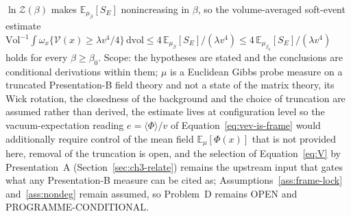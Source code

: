 \(\ln\mathcal Z(\beta)\) makes \(\mathbb E_{\mu_\beta}[S_E]\) nonincreasing in \(\beta\), so the volume-averaged soft-event estimate \(\mathrm{Vol}^{-1}\int\omega_x\{\mathcal V(x)\ge\lambda v^4/4\}\,\mathrm{dvol}\le4\,\mathbb E_{\mu_\beta}[S_E]/(\lambda v^4)\le4\,\mathbb E_{\mu_{\beta_0}}[S_E]/(\lambda v^4)\) holds for every \(\beta\ge\beta_0\). Scope: the hypotheses are stated and the conclusions are conditional derivations within them; \(\mu\) is a Euclidean Gibbs probe measure on a truncated Presentation-B field theory and not a state of the matrix theory, its Wick rotation, the closedness of the background and the choice of truncation are assumed rather than derived, the estimate lives at configuration level so the vacuum-expectation reading \(e=\langle\Phi\rangle/v\) of Equation~\eqref{eq:vev-is-frame} would additionally require control of the mean field \(\mathbb E_\mu[\Phi(x)]\) that is not provided here, removal of the truncation is open, and the selection of Equation~\eqref{eq:V} by Presentation~A (Section~\ref{sec:ch3-relate}) remains the upstream input that gates what any Presentation-B measure can be cited as; Assumptions~\ref{ass:frame-lock} and~\ref{ass:nondeg} remain assumed, so Problem~D remains OPEN and PROGRAMME-CONDITIONAL.
